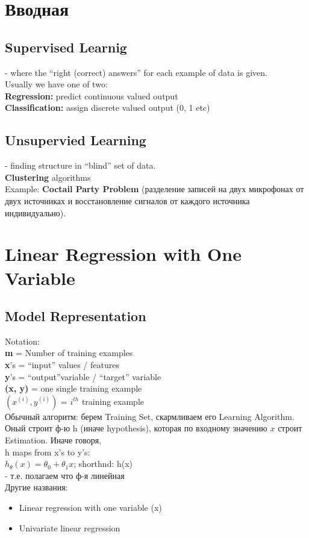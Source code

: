 \documentclass{scrartcl}
\begin{document}
\label{Chapter 1}
\section {Вводная}
\subsection* {Supervised Learnig} - where the ``right (correct)
answers'' for
each example of data is given. \\
Usually we have one of two:\\
{\bf Regression:} predict continuous valued output \\
{\bf Classification:} assign discrete valued output (0, 1 etc) \\

\subsection* {Unsupervied Learning} - finding structure in ``blind''
set of
data. \\
{\bf Clustering} algorithms  \\
Example: {\bf Coctail Party Problem} (разделение записей на двух
микрофонах от двух источниках и восстановление сигналов от каждого
источника
индивидуально). \\

\label{Chapter 2}
\section {Linear Regression with One Variable}

\subsection {Model Representation}
Notation: \\
{\bf m} =  Number of training examples \\
{\bf x}'s = ``input'' values / features \\
{\bf y}'s = ``output''variable / ``target'' variable \\
{\bf (x, y)} = one single training example \\
{\bf $(x^{(i)}, y^{(i)})$} = $i^{th}$ training example \\

Обычный алгоритм: берем Training Set, скармливаем его Learning
Algorithm. Оный строит ф-ю h (иначе hypothesis), которая по входному
значению $x$ строит Estimation. Иначе говоря, \\
h maps from x's to y's: \\
$h_\theta(x)=\theta_0 + \theta_1x$; shorthnd: h(x) \\
- т.е. полагаем что ф-я линейная \\
Другие названия:
\begin{itemize}
\item Linear regression with one variable (x)
\item Univariate linear regression
\end{itemize}
\end{document}

